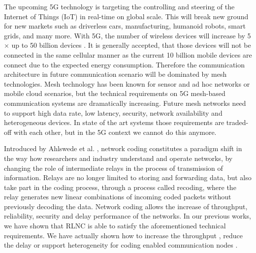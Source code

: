 %

The upcoming 5G technology is targeting the controlling and steering of the Internet of Things (IoT) in real-time on global scale. This will break new ground for new markets such as driverless cars, manufacturing, humanoid robots, smart grids, and many more. With 5G, the number of wireless devices will increase by 5$\times$ up to 50 billion devices \cite{cisco2011forecast}. It is generally accepted, that those devices will not be connected in the same cellular manner as the current 10 billion mobile devices are connect due to the expected energy consumption. Therefore the communication architecture in future communication scenario will be dominated by mesh technologies. Mesh technology has been known for sensor and ad hoc networks or mobile cloud scenarios, but the technical requirements on 5G mesh-based communication systems are dramatically increasing. Future mesh networks need to support high data rate, low latency, security, network availability and heterogeneous devices. In state of the art systems those requirements are traded-off with each other, but in the 5G context we cannot do this anymore.

Introduced by Ahlswede et al. \cite{ahlswede2000network}, network coding constitutes a paradigm shift in the way how researchers and industry understand and operate networks, by changing the role of intermediate relays in the process of transmission of information. Relays are no longer limited to storing and forwarding data, but also take part in the coding process, through a process called recoding, where the relay generates new linear combinations of incoming coded packets without previously decoding the data. Network coding allows the increase of throughput, reliability, security and delay performance of the networks. In our previous works, we have shown that \ac{RLNC} \cite{koetter2003algebraic,ho2006random} is able to satisfy the aforementioned technical requirements. We have actually shown how to increase the throughput \cite{pahlevani2013playncool}, reduce the delay \cite{szabo2015towards} or support heterogeneity for coding enabled communication nodes \cite{lucani2014fulcrum}.

